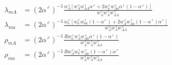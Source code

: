 \documentclass[12pt]{article}
\begin{document}
\begin{subequations}\label{Binvasion}
\begin{align}
\lambda_{mA}&= (2 \alpha^\male)^{-1}\frac{w_{A}^\female \left[w_{A}^\male w_{AA}^\female \alpha^\male + 2 w_{a}^\male w_{Aa}^\female \alpha^\female(1-\alpha^\male)\right]}{ w_{A}^\male w_{A}^\female w_{AA}^\female } \\
\lambda_{ma}&= (2 \alpha^\male)^{-1} \frac{w_{a}^\female \left[ w_{a}^\male w_{aa}^\female (1-\alpha^\male) + 2 w_{A}^\male w_{Aa}^\female(1-\alpha^\female)\alpha^\male\right]}{w_{A}^\male w_{A}^\female w_{AA}^\female } \\
\rho_{mA}&= (2 \alpha^\male)^{-1}\frac{R w_{a}^\male w_{A}^\female w_{Aa}^\female \alpha^\female(1-\alpha^\male)}{w_{A}^\male w_{A}^\female w_{AA}^\female } \\
\rho_{ma}&= (2 \alpha^\male)^{-1}\frac{R w_{A}^\male w_{a}^\female w_{Aa}^\female (1-\alpha^\female)\alpha^\male}{w_{A}^\male w_{A}^\female w_{AA}^\female} 
\end{align}
\end{subequations}
\end{document}
